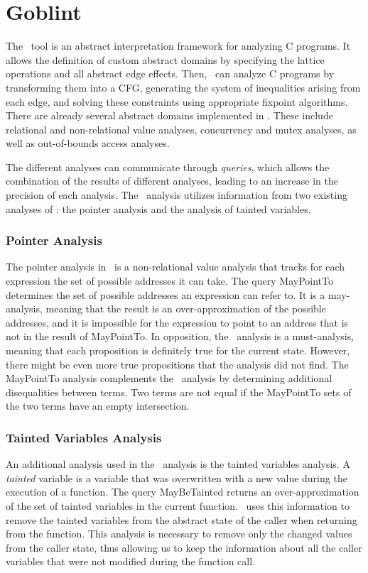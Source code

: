 \section{Goblint}\label{section:goblint}

The \goblint\ tool is an abstract interpretation framework for analyzing C programs.
It allows the definition of custom abstract domains by specifying the lattice operations and all abstract edge effects.
Then, \goblint\ can analyze C programs by transforming them into a CFG, generating the system of inequalities arising from each edge, and solving these constraints using appropriate fixpoint algorithms.
There are already several abstract domains implemented in \goblint. These include relational and non-relational value analyses, concurrency and mutex analyses, as well as out-of-bounds access analyses.

The different analyses can communicate through \emph{queries}, which allows the combination of the results of different analyses, leading to an increase in the precision of each analysis.
The \cpo\ analysis utilizes information from two existing analyses of \goblint: the pointer analysis and the analysis of tainted variables.

\subsubsection{Pointer Analysis}

The pointer analysis in \goblint\ is a non-relational value analysis that tracks for each expression the set of possible addresses it can take.
The query \textsf{MayPointTo} determines the set of possible addresses an expression can refer to.
It is a may-analysis, meaning that the result is an over-approximation of the possible addresses, and it is impossible for the expression to point to an address that is not in the result of \textsf{MayPointTo}.
In opposition, the \cpo\ analysis is a must-analysis, meaning that each proposition is definitely true for the current state. However, there might be even more true propositions that the analysis did not find.
The \textsf{MayPointTo} analysis complements the \cpo\ analysis by determining additional disequalities between terms.
Two terms are not equal if the \textsf{MayPointTo} sets of the two terms have an empty intersection.

\subsubsection{Tainted Variables Analysis}

An additional analysis used in the \cpo\ analysis is the tainted variables analysis.
A \emph{tainted} variable is a variable that was overwritten with a new value during the execution of a function.
The query \textsf{MayBeTainted} returns an over-approximation of the set of tainted variables in the current function.
\cpo\ uses this information to remove the tainted variables from the abstract state of the caller when returning from the function.
This analysis is necessary to remove only the changed values from the caller state, thus allowing us to keep the information about all the caller variables that were not modified during the function call.
